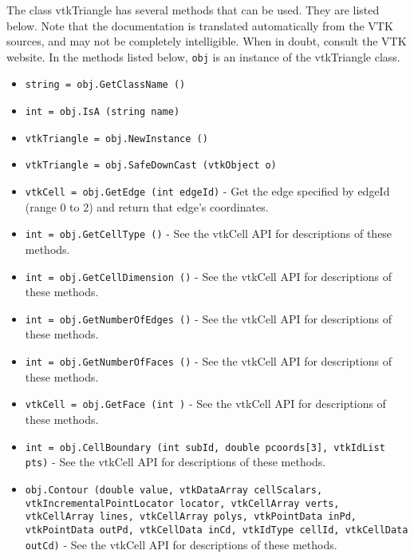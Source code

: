 The class vtkTriangle has several methods that can be used.
  They are listed below.
Note that the documentation is translated automatically from the VTK sources,
and may not be completely intelligible.  When in doubt, consult the VTK website.
In the methods listed below, \verb|obj| is an instance of the vtkTriangle class.
\begin{itemize}
\item  \verb|string = obj.GetClassName ()|

\item  \verb|int = obj.IsA (string name)|

\item  \verb|vtkTriangle = obj.NewInstance ()|

\item  \verb|vtkTriangle = obj.SafeDownCast (vtkObject o)|

\item  \verb|vtkCell = obj.GetEdge (int edgeId)| -  Get the edge specified by edgeId (range 0 to 2) and return that edge's
 coordinates.

\item  \verb|int = obj.GetCellType ()| -  See the vtkCell API for descriptions of these methods.

\item  \verb|int = obj.GetCellDimension ()| -  See the vtkCell API for descriptions of these methods.

\item  \verb|int = obj.GetNumberOfEdges ()| -  See the vtkCell API for descriptions of these methods.

\item  \verb|int = obj.GetNumberOfFaces ()| -  See the vtkCell API for descriptions of these methods.

\item  \verb|vtkCell = obj.GetFace (int )| -  See the vtkCell API for descriptions of these methods.

\item  \verb|int = obj.CellBoundary (int subId, double pcoords[3], vtkIdList pts)| -  See the vtkCell API for descriptions of these methods.

\item  \verb|obj.Contour (double value, vtkDataArray cellScalars, vtkIncrementalPointLocator locator, vtkCellArray verts, vtkCellArray lines, vtkCellArray polys, vtkPointData inPd, vtkPointData outPd, vtkCellData inCd, vtkIdType cellId, vtkCellData outCd)| -  See the vtkCell API for descriptions of these methods.


\end{itemize}
